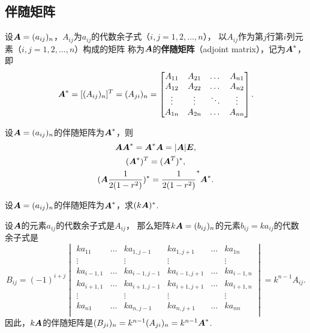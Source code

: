\subsection{伴随矩阵}
\begin{definition}\label{definition:伴随矩阵.伴随矩阵的定义}
设\(\boldsymbol{A}=(a_{ij})_n\)，\(A_{ij}\)为\(a_{ij}\)的代数余子式（\(i,j=1,2,\dotsc,n\)），%
以\(A_{ij}\)作为第\(j\)行第\(i\)列元素（\(i,j=1,2,\dotsc,n\)）构成的矩阵%
称为\(\boldsymbol{A}\)的\textbf{伴随矩阵}（adjoint matrix），记为\(\boldsymbol{A}^*\)，即\[
\boldsymbol{A}^*
= [(A_{ij})_n]^T
= (A_{ji})_n
= \begin{bmatrix}
A_{11} & A_{21} & \dots & A_{n1} \\
A_{12} & A_{22} & \dots & A_{n2} \\
\vdots & \vdots & \ddots & \vdots \\
A_{1n} & A_{2n} & \dots & A_{nn}
\end{bmatrix}.
\]
\end{definition}

\begin{theorem}
设\(\boldsymbol{A}=(a_{ij})_n\)的伴随矩阵为\(\boldsymbol{A}^*\)，则\begin{gather}
\boldsymbol{A} \boldsymbol{A}^* = \boldsymbol{A}^* \boldsymbol{A} = \abs{\boldsymbol{A}} \boldsymbol{E}, \label{equation:行列式.伴随矩阵.恒等式1} \\
(\boldsymbol{A}^*)^T = (\boldsymbol{A}^T)^*, \label{equation:行列式.伴随矩阵.恒等式2} \\
(\boldsymbol{A}\frac{1}{2(1-r^2)})^* = \frac{1}{2(1-r^2)}^* \boldsymbol{A}^*. \label{equation:行列式.伴随矩阵.恒等式3}
\end{gather}
\end{theorem}

\begin{example}
设\(\boldsymbol{A}=(a_{ij})_n\)的伴随矩阵为\(\boldsymbol{A}^*\)，求\((k\boldsymbol{A})^*\).
\begin{solution}
设\(\boldsymbol{A}\)的元素\(a_{ij}\)的代数余子式是\(A_{ij}\)，%
那么矩阵\(k\boldsymbol{A} = (b_{ij})_n\)的元素\(b_{ij} = k a_{ij}\)的代数余子式是\[
B_{ij}
= (-1)^{i+j} \begin{vmatrix}
k a_{11} & \dots & k a_{1,j-1} & k a_{1,j+1} & \dots & k a_{1n} \\
\vdots & & \vdots & \vdots & & \vdots \\
k a_{i-1,1} & \dots & k a_{i-1,j-1} & k a_{i-1,j+1} & \dots & k a_{i-1,n} \\
k a_{i+1,1} & \dots & k a_{i+1,j-1} & k a_{i+1,j+1} & \dots & k a_{i+1,n} \\
\vdots & & \vdots & \vdots & & \vdots \\
k a_{n1} & \dots & k a_{n,j-1} & k a_{n,j+1} & \dots & k a_{nn} \\
\end{vmatrix}
= k^{n-1} A_{ij}.
\]
因此，\(k\boldsymbol{A}\)的伴随矩阵是\(
(B_{ji})_n = k^{n-1} (A_{ji})_n
= k^{n-1} \boldsymbol{A}^*
\).
\end{solution}
\end{example}

